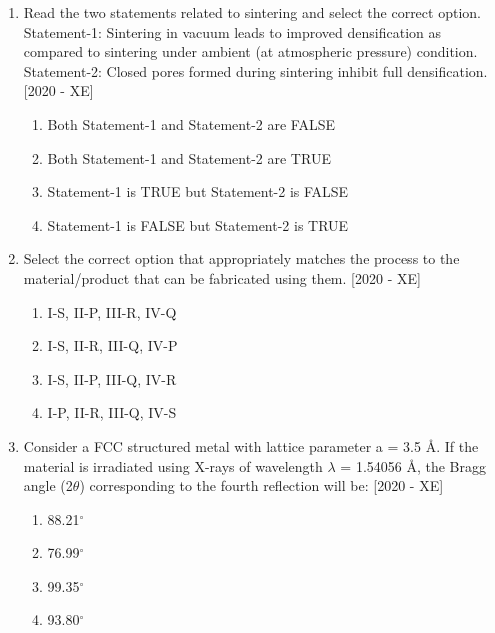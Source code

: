 \documentclass[journal]{IEEEtran}
\begin{document}
\begin{enumerate}
    \item Read the two statements related to sintering and select the correct option.\\

    Statement-1: Sintering in vacuum leads to improved densification as compared to sintering under ambient (at atmospheric pressure) condition.\\

    Statement-2: Closed pores formed during sintering inhibit full densification.\hfill{[2020 - XE]}
    \begin{enumerate}
        \item Both Statement-1 and Statement-2 are FALSE
        \item Both Statement-1 and Statement-2 are TRUE
        \item Statement-1 is TRUE but Statement-2 is FALSE
        \item Statement-1 is FALSE but Statement-2 is TRUE
    \end{enumerate}

    \item Select the correct option that appropriately matches the process to the material/product that can be fabricated using them. \hfill{[2020 - XE]}
    \begin{table}[h]
        \centering
        
    \end{table}
    \begin{enumerate}
        \item I-S, II-P, III-R, IV-Q
        \item I-S, II-R, III-Q, IV-P
        \item I-S, II-P, III-Q, IV-R
        \item I-P, II-R, III-Q, IV-S
    \end{enumerate}
    \item Consider a FCC structured metal with lattice parameter a = 3.5 \r{A}. If the material is irradiated using X-rays of wavelength $\lambda$ = 1.54056 \r{A}, the Bragg angle (2$\theta$) corresponding to the fourth reflection will be: \hfill{[2020 - XE]}
    \begin{enumerate}
        \item 88.21$^\circ$
        \item 76.99$^\circ$
        \item 99.35$^\circ$
        \item 93.80$^\circ$
    \end{enumerate}
    

\end{enumerate}
\end{document}
